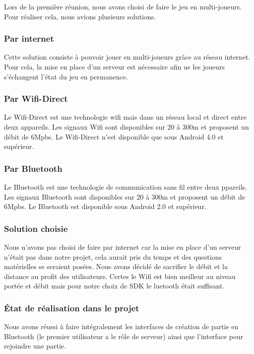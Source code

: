 \documentclass{report}
\begin{document}
Lors de la première réunion, nous avons choisi de faire le jeu en
multi-joueurs. Pour réaliser cela, nous avions plusieurs solutions.

\subsubsection{Par internet}

Cette solution consiste à pouvoir jouer en multi-joueurs grâce au réseau
internet. Pour cela, la mise en place d’un serveur est nécessaire afin
ue les joueurs s’échangent l’état du jeu en permanence.

\subsubsection{Par Wifi-Direct}

Le Wifi-Direct est une technologie wifi mais dans un réseau local et
direct entre deux appareils. Les signaux Wifi sont disponibles sur 20
à 300m et proposent un débit de 6Mpbs.
Le Wifi-Direct n’est disponible que sous Android 4.0 et supérieur.

\subsubsection{Par Bluetooth}

Le Bluetooth est une technologie de communication sans fil entre deux
ppareils. Les signaux Bluetooth sont disponibles sur 20 à 300m et
proposent un débit de 6Mpbs.
Le Bluetooth est disponible sous Android 2.0 et supérieur.

\subsubsection{Solution choisie}

Nous n’avons pas choisi de faire par internet car la mise en place d’un
serveur n’était pas dans notre projet, cela aurait pris du temps et des
questions matérielles se seraient posées. Nous avons décidé de sacrifier
le débit et la distance au profit des utilisateurs. Certes le Wifi est
bien meilleur au niveau portée et débit mais pour notre choix de SDK le
luetooth était suffisant.

\subsubsection{État de réalisation dans le projet}

Nous avons réussi à faire intégralement les interfaces de création de
partie en Bluetooth (le premier utilisateur a le rôle de serveur) ainsi
que l’interface pour rejoindre une partie.
\end{document}
